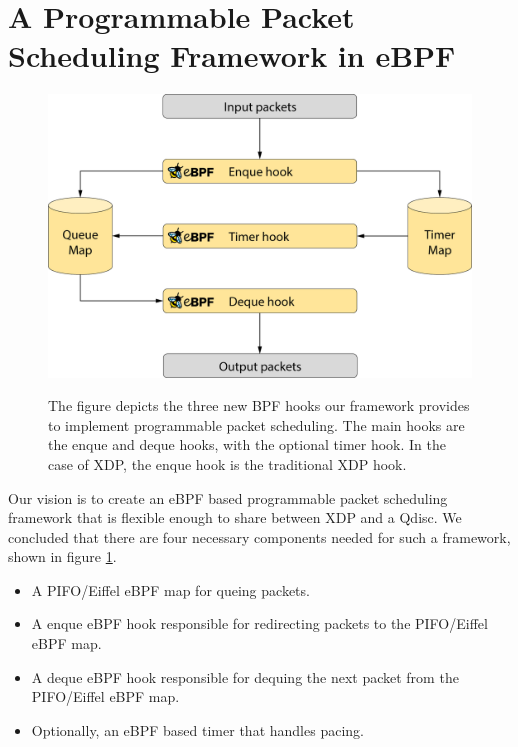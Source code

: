 \documentclass[sigconf, nonacm]{acmart}
\begin{document}
\section{A Programmable Packet Scheduling Framework in eBPF}

\begin{figure}
  \includegraphics[width=\linewidth]{bpf_pps_flow.png} %
  \label{fig:bpf_pps_flow}

  \caption{The figure depicts the three new BPF hooks our framework provides to
           implement programmable packet scheduling. The main hooks are the enque and deque
           hooks, with the optional timer hook. In the case of XDP, the enque hook is the
           traditional XDP hook.}

\end{figure}

Our vision is to create an eBPF based programmable packet scheduling framework
that is flexible enough to share between XDP and a Qdisc. We concluded that
there are four necessary components needed for such a framework, shown in figure
\ref{fig:bpf_pps_flow}.

\begin{itemize}
        \item A PIFO/Eiffel eBPF map for queing packets.
        \item A enque eBPF hook responsible for redirecting packets to the PIFO/Eiffel eBPF map.
        \item A deque eBPF hook responsible for dequing the next packet from the PIFO/Eiffel eBPF map.
        \item Optionally, an eBPF based timer that handles pacing.
\end{itemize}
\end{document}

